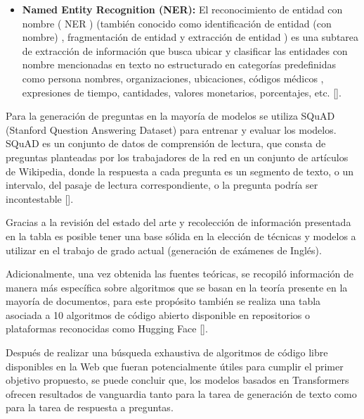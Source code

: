 \documentclass[../Main.tex]{subfiles}
\begin{document}
\begin{itemize}
    \item \textbf{Named Entity Recognition (NER):} El reconocimiento de entidad con nombre ( NER ) (también conocido como identificación de entidad (con nombre) , fragmentación de entidad y extracción de entidad ) es una subtarea de extracción de información que busca ubicar y clasificar las entidades con nombre mencionadas en texto no estructurado en categorías predefinidas como persona nombres, organizaciones, ubicaciones, códigos médicos , expresiones de tiempo, cantidades, valores monetarios, porcentajes, etc. [].
\end{itemize}\par


\begin{justify}
Para la generación de preguntas en la mayoría de modelos se utiliza SQuAD (Stanford Question Answering Dataset) para entrenar y evaluar los modelos. SQuAD es un conjunto de datos de comprensión de lectura, que consta de preguntas planteadas por los trabajadores de la red en un conjunto de artículos de Wikipedia, donde la respuesta a cada pregunta es un segmento de texto, o un intervalo, del pasaje de lectura correspondiente, o la pregunta podría ser incontestable [].
\end{justify}

\begin{justify}
Gracias a la revisión del estado del arte y recolección de información presentada en la tabla es posible tener una base sólida en la elección de técnicas y modelos a utilizar en el trabajo de grado actual (generación de exámenes de Inglés).
\end{justify}

\begin{justify}
Adicionalmente, una vez obtenida las fuentes teóricas, se recopiló información de manera más específica sobre algoritmos que se basan en la teoría presente en la mayoría de documentos, para este propósito también se realiza una tabla asociada a 10 algoritmos de código abierto disponible en repositorios o plataformas reconocidas como Hugging Face [].
\end{justify}

\begin{justify}
Después de realizar una búsqueda exhaustiva de algoritmos de código libre disponibles en la Web que fueran potencialmente útiles para cumplir el primer objetivo propuesto, se puede concluir que, los modelos basados en Transformers ofrecen resultados de vanguardia tanto para la tarea de generación de texto como para la tarea de respuesta a preguntas. 
\end{justify}
\end{document}
